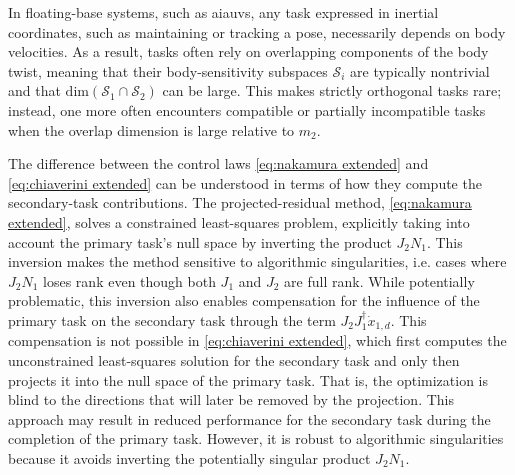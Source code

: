\documentclass[../main.tex]{subfiles}
\begin{document}
In floating-base systems, such as \glspl{aiauv}, any task expressed in inertial coordinates, such as maintaining or tracking a pose, necessarily depends on body velocities. As a result, tasks often rely on overlapping components of the body twist, meaning that their body-sensitivity subspaces \( \mathcal{S}_i \) are typically nontrivial and that \( \mathrm{dim}(\mathcal{S}_1\cap\mathcal{S}_2) \) can be large. This makes strictly orthogonal tasks rare; instead, one more often encounters compatible or partially incompatible tasks when the overlap dimension is large relative to \( m_2 \).


The difference between the control laws \eqref{eq:nakamura extended} and \eqref{eq:chiaverini extended} can be understood in terms of how they compute the secondary-task contributions. The projected-residual method, \eqref{eq:nakamura extended}, solves a constrained least-squares problem, explicitly taking into account the primary task's null space by inverting the product \( J_2N_1 \). This inversion makes the method sensitive to algorithmic singularities, i.e. cases where \( J_2N_1 \) loses rank even though both \( J_1 \) and \( J_2 \) are full rank. While potentially problematic, this inversion also enables compensation for the influence of the primary task on the secondary task through the term \( J_2J_1^\dagger \dot{x}_{1,d} \). This compensation is not possible in \eqref{eq:chiaverini extended}, which first computes the unconstrained least-squares solution for the secondary task and only then projects it into the null space of the primary task. That is, the optimization is blind to the directions that will later be removed by the projection. This approach may result in reduced performance for the secondary task during the completion of the primary task. However, it is robust to algorithmic singularities because it avoids inverting the potentially singular product \( J_2 N_1 \). 
\end{document}
